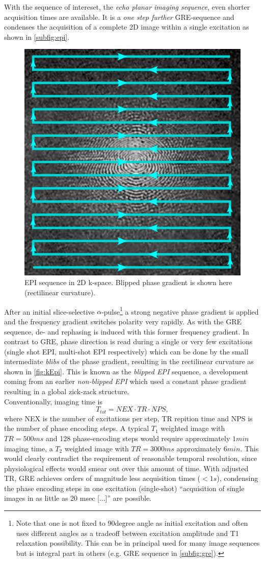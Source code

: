 \documentclass[a4paper]{scrartcl}
\begin{document}
With the sequence of intereset, the \textit{echo planar imaging sequence}, even shorter acquisition times are available.
It is a \textit{one step further} GRE-sequence and condenses the acquisition of a complete 2D image within a single excitation as shown in \autoref{subfig:epi}.
\begin{figure}[bh]
  \centering
  \includegraphics[width = .4\textwidth]{pictures/kSpaceEpi.png}
  \caption{EPI sequence in 2D k-space. Blipped phase gradient is shown here (rectilinear curvature).}
  \label{fig:kEpi}
\end{figure}
After an initial slice-selective $\alpha$-pulse\footnote{Note that one is not fixed to 90degree angle as initial excitation and often uses different angles as a tradeoff between excitation amplitude and T1 relaxation possibility. This can be in principal used for many image sequences but is integral part in others (e.g. GRE sequence in \autoref{subfig:gre}).} a strong negative phase gradient is applied and the frequency gradient switches polarity very rapidly.
As with the GRE sequence, de- and rephasing is induced with this former frequency gradient. 
In contrast to GRE, phase direction is read during a single or very few excitations (single shot EPI, multi-shot EPI respectively) which can be done by the small intermediate \textit{blibs} of the phase gradient, resulting in the rectilinear curvature as shown in \autoref{fig:kEpi}.
This is known as the \textit{blipped EPI} sequence, a development coming from an earlier \textit{non-blipped EPI} which used a constant phase gradient resulting in a global zick-zack structure.\cite[1048]{delapaz}\\
Conventionally, imaging time is
\begin{equation}
  T_{tot} = NEX \cdot TR \cdot NPS,
\end{equation}
where NEX is the number of excitations per step, TR repition time and NPS is the number of phase encoding steps.
A typical $T_1$ weighted image with $TR = 500ms$ and 128 phase-encoding steps would require approximately $1min$ imaging time, a $T_2$ weighted image with $TR = 3000ms$ approximately $6min$.\cite[92]{buxton}
This would clearly contradict the requirement of reasonable temporal resolution, since physiological effects would smear out over this amount of time.
With adjusted TR, GRE achieves orders of magnitude less acquisition times ($<1s$), condensing the phase encoding steps in one excitation (single-shot) \enquote{acquisition of single images in as little as 20 msec [...]}\cite[1045]{delapaz} are possible.
\end{document}
